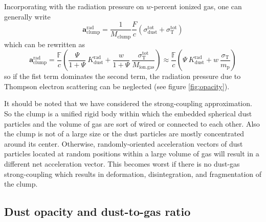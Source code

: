 \documentclass[twocolumn]{aastex62}
\begin{document}
Incorporating with the radiation pressure on $w$-percent ionized gas, one can generally write
\begin{equation}
\textbf{a}_{\mathrm{clump}}^{\mathrm{rad}} =
\frac{1}{M_{\mathrm{clump}}} \frac{F}{c} \left( \sigma_{\mathrm{dust}}^{\mathrm{tot}} +
\sigma_{\mathrm{T}}^{\mathrm{tot}}
\right)
\end{equation}
which can be rewritten as
\begin{equation}
\textbf{a}_{\mathrm{clump}}^{\mathrm{rad}} =
\frac{\mathbb{F}}{c} \left( 
\frac{\Psi}{1+\Psi}\ K^{\mathrm{rad}}_{\mathrm{dust}}
+ \frac{w}{1+\Psi}\ \frac{\sigma_{\mathrm{T}}^{\mathrm{tot}}}{M_{\mathrm{ion.gas}}} \right) \approx
\frac{\mathbb{F}}{c} \left( 
\Psi\ K^{\mathrm{rad}}_{\mathrm{dust}}
+ w\ \frac{\sigma_{\mathrm{T}}}{m_{\mathrm{p}}} \right)
\end{equation}
so if the fist term dominates the second term, the radiation pressure due to Thompson electron scattering can be neglected (see figure \ref{fig:opacity}).

It should be noted that we have considered the strong-coupling approximation. So the clump is a unified rigid body within which the embedded spherical dust particles and the volume of gas are sort of wired or connected to each other. Also the clump is not of a large size or the dust particles are mostly concentrated around its center. Otherwise, randomly-oriented acceleration vectors of dust particles located at random positions within a large volume of gas will result in a different net acceleration vector. This becomes worst if there is no dust-gas strong-coupling which results in deformation, disintegration, and fragmentation of the clump.

\subsection{Dust opacity and dust-to-gas ratio}\label{sec:append_dust}
\end{document}
